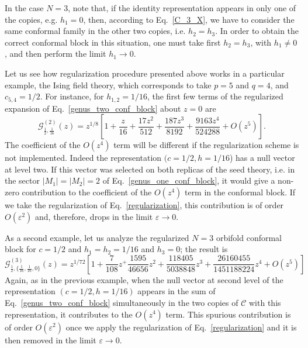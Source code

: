 \documentclass[a4paper,11pt]{article}
\begin{document}
In the case $N=3$, note that, if the identity representation appears in only one of the copies, 
e.g. $h_1=0$, then, according to Eq.~\eqref{C_3_X},  we have to consider the same conformal family in the 
other two copies, i.e. $h_2=h_3$.  In order to obtain the correct conformal block in this situation,
one must take first $h_2=h_3$, with $h_1\neq 0$, and then perform the limit $h_1\to 0$. 

Let us see how regularization procedure presented above works in a particular example, the Ising field 
theory, which corresponds to take $p=5$ and $q=4$, and $c_{5, 4}=1/2$. For instance, for $h_{1, 2}=1/16$, 
the first few terms of the regularized expansion of Eq.~\eqref{genus_two_conf_block} about $z=0$ are 
\begin{equation}
 \mathcal{G}_{\frac{1}{2}, \frac{1}{16}}^{(2)}(z)=z^{1/8}
 \left[1+\frac{z}{16}+\frac{17z^2}{512}+\frac{187z^3}{8192}+\frac{9163z^4}{524288}+O(z^5)\right].
\end{equation}
The coefficient of the $O(z^4)$ term will be different if the regularization scheme is not implemented.
Indeed the representation $(c=1/2, h=1/16$) has a null vector at level two. If this vector was selected on both
replicas of the seed theory, i.e. in the sector $|M_1|=|M_2|=2$ of Eq.~\eqref{genus_one_conf_block}, it 
would give a non-zero contribution to the coefficient of the $O(z^4)$ term in the conformal block. 
If we take the regularization of Eq.~\eqref{regularization}, this contribution is of order $O(\varepsilon^2)$
and, therefore, drops in the limit $\varepsilon\to 0$.

As a second example, let us analyze the regularized $N=3$ orbifold conformal block for $c=1/2$ and $h_1=h_2=1/16$
and $h_3=0$; the result is 
\begin{equation}
 \mathcal{G}_{\frac{1}{2}, \{\frac{1}{16}, \frac{1}{16}, 0\}}^{(3)}(z)=
 z^{1/72}\left[1+\frac{7}{108}z^+\frac{1595}{46656}z^2+
 \frac{118405}{5038848}z^3+\frac{26160455}{1451188224}z^4+O(z^5)\right]
\end{equation}
Again, as in the previous example, when the null vector at second level 
of the representation $(c=1/2, h=1/16)$ appears in the sum of Eq.~\eqref{genus_two_conf_block} 
simultaneously in the two copies of $\mathcal{C}$ with this representation, 
it contributes to the $O(z^4)$ term. This spurious contribution is of order $O(\varepsilon^2)$ 
once we apply the regularization of Eq.~\eqref{regularization} and it is then removed in the
limit $\varepsilon\to0$.
\end{document}
